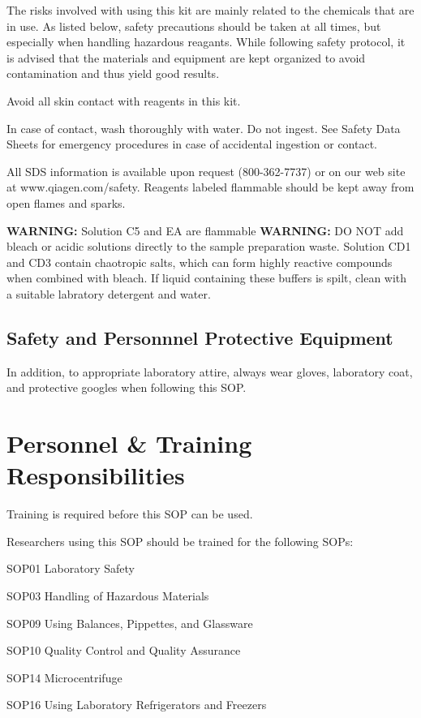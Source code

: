\documentclass[12pt]{SOP5_beta}\usepackage[]{graphicx}\usepackage[]{xcolor}
\begin{document}
\NP The risks involved with using this kit are mainly related to the chemicals that are in use. As listed below, safety precautions should be taken at all times, but especially when handling hazardous reagants. While following safety protocol, it is advised that the materials and equipment are kept organized to avoid contamination and thus yield good results. 

\NP Avoid all skin contact with reagents in this kit. 

\NP In case of contact, wash thoroughly with water. Do not
ingest. See Safety Data Sheets for emergency procedures in case
of accidental ingestion or contact. 

\NP All SDS information is available upon request (800-362-7737) or on our web site at www.qiagen.com/safety. Reagents labeled flammable should be kept away from open flames and sparks.

\NP \textbf{WARNING:} Solution C5 and EA are flammable 
\NP \textbf{WARNING:} DO NOT add bleach or acidic solutions directly to the sample preparation waste. Solution CD1 and CD3 contain chaotropic salts, which can form highly reactive compounds when combined with bleach. If liquid containing these buffers is spilt, clean with a suitable labratory detergent and water. 
 
\subsection {Safety and Personnnel Protective Equipment}

\NP In addition, to appropriate laboratory attire, always wear gloves, laboratory coat, and protective googles when following this SOP.

\section{Personnel \& Training Responsibilities}

\NP Training is required before this SOP can be used. 

\NP Researchers using this SOP should be trained for the following SOPs:

\begin{itemize*}
  \item SOP01 Laboratory Safety
  \item SOP03 Handling of Hazardous Materials
  \item SOP09 Using Balances, Pippettes, and Glassware
  \item SOP10 Quality Control and Quality Assurance
  \item SOP14 Microcentrifuge
  \item SOP16 Using Laboratory Refrigerators and Freezers
\end{itemize*}
\end{document}
